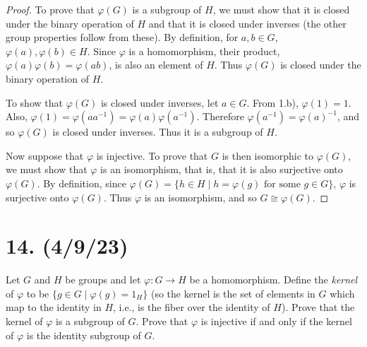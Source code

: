 \documentclass{article}
\begin{document}
\begin{proof}
    To prove that $\varphi(G)$ is a subgroup of $H$, we must show that it is closed under the binary operation of $H$ and that it is closed under inverses (the other group properties follow from these). By definition, for $a, b \in G$, $\varphi(a), \varphi(b) \in H$. Since $\varphi$ is a homomorphism, their product, $\varphi(a) \varphi(b) = \varphi(ab)$, is also an element of $H$. Thus $\varphi(G)$ is closed under the binary operation of $H$.

    To show that $\varphi(G)$ is closed under inverses, let $a \in G$. From 1.b), $\varphi(1) = 1$. Also, $\varphi(1) = \varphi(a a^{-1}) = \varphi(a) \varphi(a^{-1})$. Therefore $\varphi(a^{-1}) = \varphi(a)^{-1}$, and so $\varphi(G)$ is closed under inverses. Thus it is a subgroup of $H$.

    Now suppose that $\varphi$ is injective. To prove that $G$ is then isomorphic to $\varphi(G)$, we must show that $\varphi$ is an isomorphism, that is, that it is also surjective onto $\varphi(G)$. By definition, since $\varphi(G) = \{h \in H \mid h = \varphi(g) \text{ for some } g \in G\}$, $\varphi$ is surjective onto $\varphi(G)$. Thus $\varphi$ is an isomorphism, and so $G \cong \varphi(G)$.
\end{proof}

\section*{14. (4/9/23)}

Let $G$ and $H$ be groups and let $\varphi: G \rightarrow H$ be a homomorphism. Define the \emph{kernel} of $\varphi$ to be $\{ g \in G \mid \varphi(g) = 1_H \}$ (so the kernel is the set of elements in $G$ which map to the identity in $H$, i.e., is the fiber over the identity of $H$). Prove that the kernel of $\varphi$ is a subgroup of $G$. Prove that $\varphi$ is injective if and only if the kernel of $\varphi$ is the identity subgroup of $G$.
\end{document}
